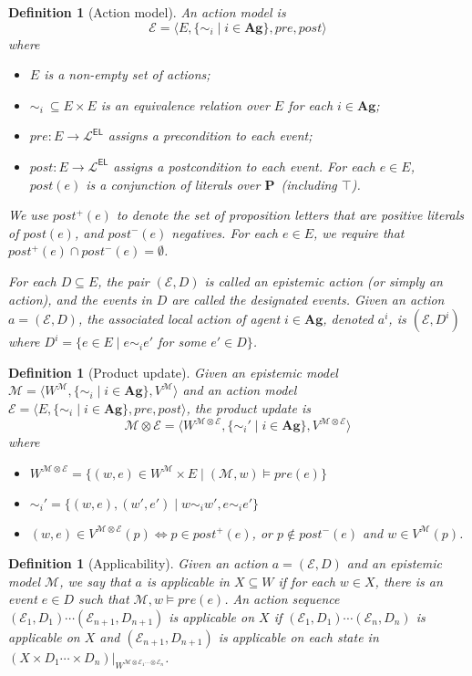 \documentclass{article}
\newtheorem{definition}[theorem]{Definition}
\newcommand{\EL}{\textsf{EL}}
\newcommand{\Ag}{\ensuremath{\mathbf{Ag}}}
\newcommand{\BP}{\ensuremath{\mathbf{P}}}
\newcommand{\M}{\mathcal{M}}
\newcommand{\E}{\mathcal{E}}
\newcommand{\lr}[1]{\langle #1 \rangle}
\newcommand{\pre}{\ensuremath{pre}}
\newcommand{\post}{\ensuremath{post}}
\newcommand{\LanEL}{\ensuremath{\mathcal{L}^\EL}}
\newcommand{\LRA}{\Leftrightarrow}
\begin{document}
\begin{definition}[Action model]
	An action model is $$\E=\lr{E,\{\sim_i\mid i\in\Ag\},\pre,\post}$$ where 
	\begin{itemize}
		\item $E$ is a non-empty set of actions;
		\item $\sim_i\ \subseteq {E\times E}$ is an equivalence relation over $E$ for each $i\in \Ag$;
		\item $\pre:E\to \LanEL$ assigns a precondition to each event;
		\item $\post:E\to \LanEL$ assigns a postcondition to each event. For each $e\in E$, $\post(e)$ is a conjunction of literals over \BP\ (including $\top$).
	\end{itemize}
We use $\post^+(e)$ to denote the set of proposition letters that are positive literals of $\post(e)$, and $\post^-(e)$ negatives. For each $e\in E$, we require that $\post^+(e)\cap\post^-(e)=\emptyset$.

For each $D\subseteq E$, the pair $(\E,D)$ is called an epistemic action (or simply an action), and the events in $D$ are called the designated events.
Given an action $a=(\E,D)$, the associated local action of agent $i\in\Ag$, denoted $a^i$, is $(\E,D^i)$ where $D^i=\{e\in E\mid e\sim_i e'$ for some $e'\in D  \}$.
\end{definition}

\begin{definition}[Product update]
Given an epistemic model $\M=\lr{W^\M, \{\sim_i\mid i\in\Ag\}, V^\M}$ and an action model $\E=\lr{E,\{\sim_i\mid i\in\Ag\},\pre,\post}$, the product update is $$\M\otimes\E=\lr{W^{\M\otimes\E},\{\sim_i'\mid i\in\Ag \},V^{\M\otimes\E}}$$ where 
\begin{itemize}
	\item $W^{\M\otimes\E}=\{(w,e)\in W^\M\times E\mid (\M,w)\vDash \pre(e) \}$
	\item $\sim_i'=\{(w,e),(w',e')\mid w\sim_i w',e\sim_i e' \}$
	\item $(w,e)\in V^{\M\otimes\E}(p)\LRA p\in\post^+(e)$, or $p\not\in\post^-(e)$ and $w\in V^\M(p)$.
\end{itemize} 
\end{definition}

\begin{definition}[Applicability]
	Given an action $a=(\E,D)$ and an epistemic model $\M$, we say that $a$ is applicable in $X\subseteq W$ if for each $w\in X$, there is an event $e\in D$ such that $\M,w\vDash \pre(e)$. An action sequence $(\E_1,D_1)\cdots (\E_{n+1},D_{n+1})$ is applicable on $X$ if $(\E_1,D_1)\cdots (\E_{n},D_{n})$ is applicable on $X$ and $(\E_{n+1},D_{n+1})$ is applicable on each state in $(X\times D_1\cdots \times D_n)|_{W^{\M\otimes\E_1\cdots \otimes \E_n}}$.
\end{definition}
\end{document}
